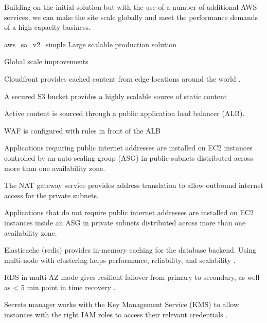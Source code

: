 
	
Building on the initial solution but with the use of a number of additional AWS services, we can make the site scale globally and meet the performance demands of a high capacity business.

\architecture
{aws_sa_v2_simple}
{Large scalable production solution}

\changes
{Global scale improvements}
{
\item \label{item:aws_sa_v2_simple_cloudfront} Cloudfront provides cached content from edge locations around the world \cite{cfn-api}. 
\item \label{item:aws_sa_v2_simple_s3_origin} A secured S3 bucket provides a highly scalable source of static content
\item \label{item:aws_sa_v2_simple_alb} Active content is sourced through a public application load balancer (ALB).
\item \label{item:aws_sa_v2_simple_waf} WAF is configured with rules in front of the ALB \cite{ AWS-shield, waf-apiref, waf-dg}
\item \label{item:aws_sa_v2_simple_azs} Applications requiring public internet addresses are installed on EC2 instances controlled by an auto-scaling group (ASG) in public subnets distributed across more than one availability zone.
\item \label{item:aws_sa_v2_simple_nat} The NAT gateway service provides address translation to allow outbound internet access for the private subnets.
\item \label{item:aws_sa_v2_simple_private} Applications that do not require public internet addresses are installed on EC2 instances inside an ASG in private subnets distributed across more than one availability zone.
\item \label{item:aws_sa_v2_simple_elasticache} Elasticache (redis) provides in-memory caching for the database backend. Using multi-node with clustering helps performance, reliability, and scalability \cite{redis-ug}. 

\item \label{item:aws_sa_v2_simple_rds} RDS in multi-AZ mode gives resilient failover from primary to secondary, as well as < 5 min point in time recovery \cite{rds-api}.
\item \label{item:aws_sa_v2_simple_secrets} Secrets manager works with the Key Management Service (KMS) to allow instances with the right IAM roles to access their relevant credentials \cite{secretsmanager-userguide}.
}

